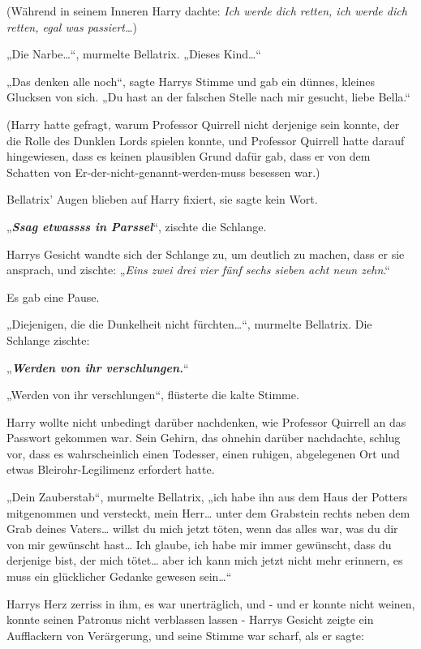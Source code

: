 {(Während in seinem Inneren Harry dachte: \emph{Ich werde dich retten, ich werde dich retten, egal was passiert…})

„Die Narbe…“, murmelte Bellatrix. „Dieses Kind…“

„Das denken alle noch“, sagte Harrys Stimme und gab ein dünnes, kleines Glucksen von sich. „Du hast an der falschen Stelle nach mir gesucht, liebe Bella.“

(Harry hatte gefragt, warum Professor Quirrell nicht derjenige sein konnte, der die Rolle des Dunklen Lords spielen konnte, und Professor Quirrell hatte darauf hingewiesen, dass es keinen plausiblen Grund dafür gab, dass er von dem Schatten von Er-der-nicht-genannt-werden-muss besessen war.)

Bellatrix' Augen blieben auf Harry fixiert, sie sagte kein Wort.

„\textbf{\emph{Ssag etwassss in Parssel}}“, zischte die Schlange.

Harrys Gesicht wandte sich der Schlange zu, um deutlich zu machen, dass er sie ansprach, und zischte: „\emph{Eins zwei drei vier fünf sechs sieben acht neun zehn}.“

Es gab eine Pause.

„Diejenigen, die die Dunkelheit nicht fürchten…“, murmelte Bellatrix. Die Schlange zischte:

„\textbf{\emph{Werden von ihr verschlungen.}}“

„Werden von ihr verschlungen“, flüsterte die kalte Stimme.

Harry wollte nicht unbedingt darüber nachdenken, wie Professor Quirrell an das Passwort gekommen war. Sein Gehirn, das ohnehin darüber nachdachte, schlug vor, dass es wahrscheinlich einen Todesser, einen ruhigen, abgelegenen Ort und etwas Bleirohr-Legilimenz erfordert hatte.

„Dein Zauberstab“, murmelte Bellatrix, „ich habe ihn aus dem Haus der Potters mitgenommen und versteckt, mein Herr… unter dem Grabstein rechts neben dem Grab deines Vaters… willst du mich jetzt töten, wenn das alles war, was du dir von mir gewünscht hast… Ich glaube, ich habe mir immer gewünscht, dass du derjenige bist, der mich tötet… aber ich kann mich jetzt nicht mehr erinnern, es muss ein glücklicher Gedanke gewesen sein…“

Harrys Herz zerriss in ihm, es war unerträglich, und - und er konnte nicht weinen, konnte seinen Patronus nicht verblassen lassen - Harrys Gesicht zeigte ein Aufflackern von Verärgerung, und seine Stimme war scharf, als er sagte:

}
